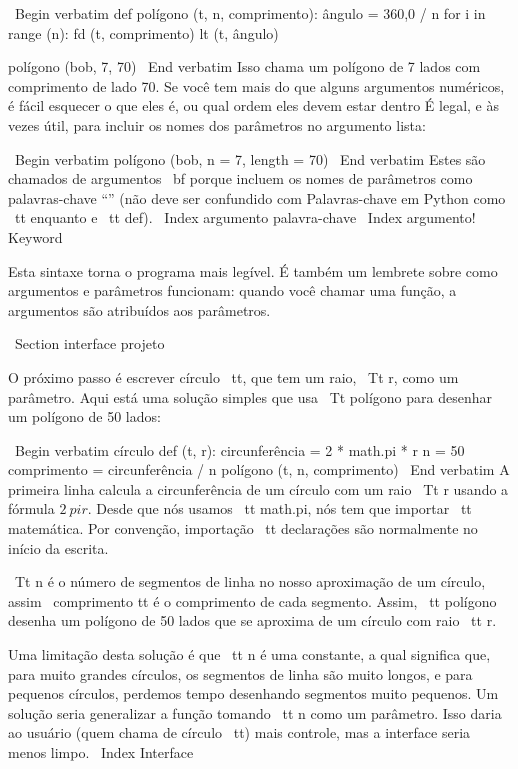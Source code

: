 \documentclass[10pt]{book}
\begin{document}
\begin {itemize}
{\ Begin {verbatim}
def polígono (t, n, comprimento):
    ângulo = 360,0 / n
    for i in range (n):
        fd (t, comprimento)
        lt (t, ângulo)

polígono (bob, 7, 70)
\ End {verbatim}
%
Isso chama um polígono de 7 lados com comprimento de lado 70. Se você tem
mais do que alguns argumentos numéricos, é fácil esquecer o que eles
é, ou qual ordem eles devem estar dentro É legal, e às vezes
útil, para incluir os nomes dos parâmetros no argumento
lista:

\ Begin {verbatim}
polígono (bob, n = 7, length = 70)
\ End {verbatim}
%
Estes são chamados de argumentos {\ bf} porque incluem
os nomes de parâmetros como palavras-chave ``'' (não deve ser confundido com
Palavras-chave em Python como {\ tt enquanto} e {\ tt def}).
\ Index {argumento palavra-chave}
\ Index {argumento! Keyword}

Esta sintaxe torna o programa mais legível. É também um lembrete
sobre como argumentos e parâmetros funcionam: quando você chamar uma função, a
argumentos são atribuídos aos parâmetros.


\ Section {interface} projeto

O próximo passo é escrever {círculo \ tt}, que tem um raio,
{\ Tt r}, como um parâmetro. Aqui está uma solução simples que usa
{\ Tt polígono} para desenhar um polígono de 50 lados:

\ Begin {verbatim}
círculo def (t, r):
    circunferência = 2 * math.pi * r
    n = 50
    comprimento = circunferência / n
    polígono (t, n, comprimento)
\ End {verbatim}
%
A primeira linha calcula a circunferência de um círculo com um raio
{\ Tt r} usando a fórmula $ 2 \ pi r $. Desde que nós usamos {\ tt math.pi}, nós
tem que importar {\ tt matemática}. Por convenção, {importação \ tt} declarações
são normalmente no início da escrita.

{\ Tt n} é o número de segmentos de linha no nosso aproximação de um círculo,
assim {\ comprimento tt} é o comprimento de cada segmento. Assim, {\ tt polígono}
desenha um polígono de 50 lados que se aproxima de um círculo com raio {\ tt r}.

Uma limitação desta solução é que {\ tt n} é uma constante, a qual
significa que, para muito grandes círculos, os segmentos de linha são muito longos, e
para pequenos círculos, perdemos tempo desenhando segmentos muito pequenos. Um
solução seria generalizar a função tomando {\ tt n} como
um parâmetro. Isso daria ao usuário (quem chama de círculo {\ tt})
mais controle, mas a interface seria menos limpo.
\ Index {Interface}

}
\end{itemize}
\end{document}
